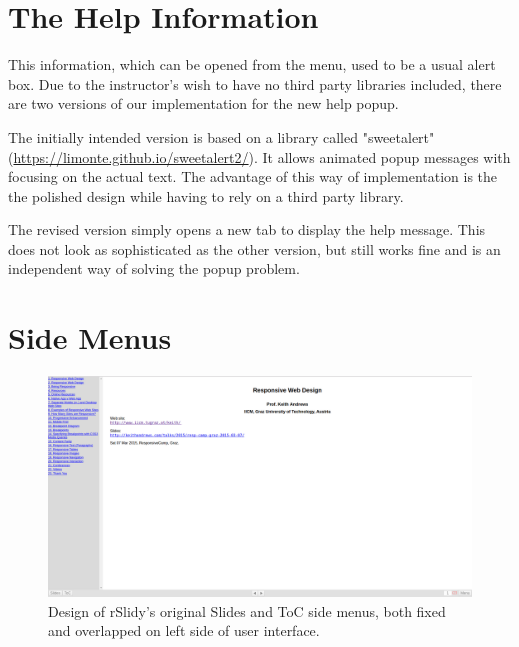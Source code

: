 \section{The Help Information}
This information, which can be opened from the menu, used to be a usual alert box. Due to the instructor's wish to have no third party libraries included, there are two versions of our implementation for the new help popup.

The initially intended version is based on a library called "sweetalert" (\url{https://limonte.github.io/sweetalert2/}). It allows animated popup messages with focusing on the actual text. The advantage of this way of implementation is the the polished design while having to rely on a third party library. 

The revised version simply opens a new tab to display the help message. This does not look as sophisticated as the other version, but still works fine and is an independent way of solving the popup problem.


\section{Side Menus} %
\label{sec:side_menus}

\begin{figure}[tp]
	\centering
	\includegraphics[width = .9\textwidth]{images/tocOld.png}
	
	\caption[Original Side Menus]{
		Design of rSlidy's original Slides and ToC side menus, both fixed and overlapped on left side of user interface.
	}
	\label{fig:sideOLD}
\end{figure}


